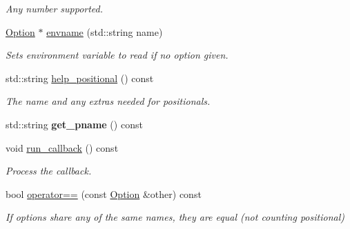 \begin{DoxyCompactItemize}
\begin{DoxyCompactList}\small\item\em Any number supported. \end{DoxyCompactList}\item 
\mbox{\label{class_c_l_i_1_1_option_aa1969c5f5a525910d761756a6d8e63a8}} 
\hyperlink{class_c_l_i_1_1_option}{Option} $\ast$ \hyperlink{class_c_l_i_1_1_option_aa1969c5f5a525910d761756a6d8e63a8}{envname} (std\+::string name)
\begin{DoxyCompactList}\small\item\em Sets environment variable to read if no option given. \end{DoxyCompactList}\item 
\mbox{\label{class_c_l_i_1_1_option_a4b4efb7ea6c264b3dc09f5022121a9fe}} 
std\+::string \hyperlink{class_c_l_i_1_1_option_a4b4efb7ea6c264b3dc09f5022121a9fe}{help\+\_\+positional} () const
\begin{DoxyCompactList}\small\item\em The name and any extras needed for positionals. \end{DoxyCompactList}\item 
\mbox{\label{class_c_l_i_1_1_option_a5b887cdb58ce7b840417e41567eb507b}} 
std\+::string {\bfseries get\+\_\+pname} () const
\item 
\mbox{\label{class_c_l_i_1_1_option_adb852929843300c4b48de5556ceea1b1}} 
void \hyperlink{class_c_l_i_1_1_option_adb852929843300c4b48de5556ceea1b1}{run\+\_\+callback} () const
\begin{DoxyCompactList}\small\item\em Process the callback. \end{DoxyCompactList}\item 
\mbox{\label{class_c_l_i_1_1_option_ae72ff0b89bebb2987d548c186c577e50}} 
bool \hyperlink{class_c_l_i_1_1_option_ae72ff0b89bebb2987d548c186c577e50}{operator==} (const \hyperlink{class_c_l_i_1_1_option}{Option} \&other) const
\begin{DoxyCompactList}\small\item\em If options share any of the same names, they are equal (not counting positional) \end{DoxyCompactList}\item 

\end{DoxyCompactItemize}
